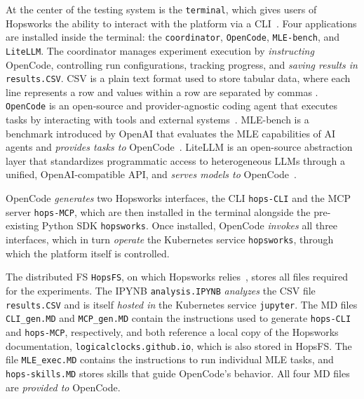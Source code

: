 \documentclass[
english,                 %
bibtex,                  %
includeExtraAbstracts, %
]{kththesis}
\numberwithin{listing}{chapter}
\begin{document}
At the center of the testing system is the \texttt{terminal}, which gives users of Hopsworks the ability to interact with the platform via a \gls{CLI}~\cite{hopsworks_ab_machine_2026, hopsworks_ab_build_2026}. Four applications are installed inside the terminal: the \texttt{coordinator}, \texttt{OpenCode}, \texttt{MLE-bench}, and \texttt{LiteLLM}. The coordinator manages experiment execution by \emph{instructing} OpenCode, controlling run configurations, tracking progress, and \emph{saving results in} \texttt{results.\gls{CSV}}. \gls{CSV} is a plain text format used to store tabular data, where each line represents a row and values within a row are separated by commas \cite{shafranovich_common_2005}. \texttt{OpenCode} is an open-source and provider-agnostic coding agent that executes tasks by interacting with tools and external systems~\cite{anomaly_innovations_inc_anomalycoopencode_2026}. \gls{MLE}-bench is a benchmark introduced by Open\Gls{AI} that evaluates the \gls{MLE} capabilities of \gls{AI} agents and \emph{provides tasks to} OpenCode~\cite{chan_mle-bench_2025}. Lite\gls{LLM} is an open-source abstraction layer that standardizes programmatic access to heterogeneous \glspl{LLM} through a unified, Open\Gls{AI}-compatible \gls{API}, and \emph{serves models to} OpenCode~\cite{litellm_berriailitellm_2026}.

OpenCode \emph{generates} two Hopsworks interfaces, the \gls{CLI} \texttt{hops-CLI} and the \gls{MCP} server \texttt{hops-MCP}, which are then installed in the terminal alongside the pre-existing Python \gls{SDK} \texttt{hopsworks}. Once installed, OpenCode \emph{invokes} all three interfaces, which in turn \emph{operate} the Kubernetes service \texttt{hopsworks}, through which the platform itself is controlled.

The distributed \gls{FS} \texttt{Hops\gls{FS}}, on which Hopsworks relies~\cite{de_la_rua_martinez_hopsworks_2024}, stores all files required for the experiments. The \gls{IPYNB} \texttt{analysis.\gls{IPYNB}} \emph{analyzes} the \gls{CSV} file \texttt{results.\gls{CSV}} and is itself \emph{hosted in} the Kubernetes service \texttt{jupyter}. The \gls{MD} files \texttt{CLI\_gen.\gls{MD}} and \texttt{MCP\_gen.\gls{MD}} contain the instructions used to generate \texttt{hops-\gls{CLI}} and \texttt{hops-\gls{MCP}}, respectively, and both reference a local copy of the Hopsworks documentation, \texttt{logicalclocks.github.io}, which is also stored in Hops\gls{FS}. The file \texttt{MLE\_exec.\gls{MD}} contains the instructions to run individual \gls{MLE} tasks, and \texttt{hops-skills.\gls{MD}} stores skills that guide OpenCode's behavior. All four \gls{MD} files are \emph{provided to} OpenCode.
\end{document}
